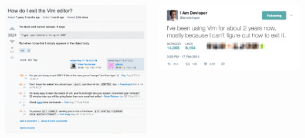 \documentclass{beamer}
\begin{document}
\begin{frame}[plain]{}
  \begin{columns}
    \begin{column}{0.5\textwidth}
      \centering\includegraphics[width=\linewidth]{figures/how-do-i-exit-vim}
    \end{column}
    \begin{column}{0.5\textwidth}
      \centering\includegraphics[width=\linewidth]{figures/vim-exit-meme}
    \end{column}
  \end{columns}
\end{frame}
\end{document}
